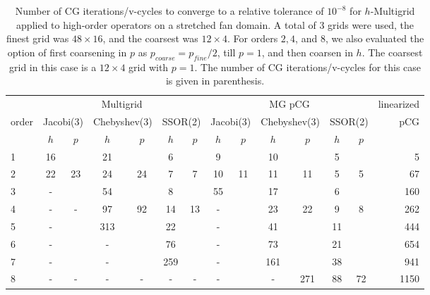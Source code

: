 \begin{table}
  \caption{\label{tab:fan-aniso} Number of CG iterations/v-cycles to converge to a relative tolerance of $10^{-8}$ for $h$-Multigrid applied to high-order operators on a stretched fan domain. A total of 3 grids were used, the finest grid was $48\times 16$, and the coarsest was $12\times 4$. For orders $2,4$, and $8$, we also evaluated the option of first coarsening in $p$ as $p_{coarse} = p_{fine}/2$, till $p=1$, and then coarsen in $h$. The coarsest grid in this case is a $12\times 4$ grid with $p=1$. The number of CG iterations/v-cycles for this case is given in parenthesis.}
		\centering
    \begin{tabular}{|l|c|c|c|c|c|c|c|c|c|c|c|c|r|} 
\hline
		        & \multicolumn{6}{c|}{Multigrid} & \multicolumn{6}{c|}{MG pCG} &          linearized \\
												 \cline{2-13}
					order &  \multicolumn{2}{c|}{\scriptsize  Jacobi(3)} &  \multicolumn{2}{c|}{\scriptsize Chebyshev(3)} & \multicolumn{2}{c|}{\scriptsize  SSOR(2)} & \multicolumn{2}{c|}{\scriptsize Jacobi(3)} &  \multicolumn{2}{c|}{\scriptsize Chebyshev(3)} & \multicolumn{2}{c|}{\scriptsize SSOR(2)} & pCG\\
		\hline
		 & $h$ & $p$ & $h$ & $p$& $h$ & $p$& $h$ & $p$& $h$ & $p$& $h$ & $p$& \\
		 \cline{2-14}
 1 &       16 &      &        21 &        &       6 &         &       9 &         &       10 &       &       5 &      & 5  \\
 2 &       22 &  23  &        24 &  24    &       7 &   7     &      10 &  11     &       11 &  11   &       5 &   5  & 67  \\
 3 &        - &      &        54 &        &       8 &         &      55 &         &       17 &       &       6 &      & 160  \\
 4 &        - &  -   &        97 &  92    &      14 &   13    &       - &         &       23 &  22   &       9 &   8  & 262  \\
 5 &        - &      &       313 &        &      22 &         &       - &         &       41 &       &      11 &      & 444  \\
 6 &        - &      &         - &        &      76 &         &       - &         &       73 &       &      21 &      & 654  \\
 7 &        - &      &         - &        &     259 &         &       - &         &      161 &       &      38 &      & 941  \\
 8 &        - &  -   &         - &  -     &       - &    -    &       - &         &        - & 271   &      88 &  72  & 1150  \\
\hline
	  \end{tabular}
\end{table}


